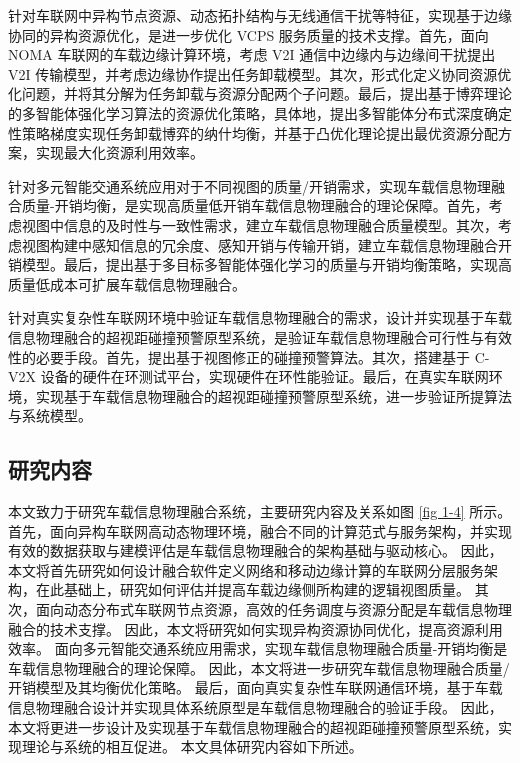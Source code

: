  针对车联网中异构节点资源、动态拓扑结构与无线通信干扰等特征，实现基于边缘协同的异构资源优化，是进一步优化 VCPS 服务质量的技术支撑。首先，面向 NOMA 车联网的车载边缘计算环境，考虑 V2I 通信中边缘内与边缘间干扰提出 V2I 传输模型，并考虑边缘协作提出任务卸载模型。其次，形式化定义协同资源优化问题，并将其分解为任务卸载与资源分配两个子问题。最后，提出基于博弈理论的多智能体强化学习算法的资源优化策略，具体地，提出多智能体分布式深度确定性策略梯度实现任务卸载博弈的纳什均衡，并基于凸优化理论提出最优资源分配方案，实现最大化资源利用效率。

 针对多元智能交通系统应用对于不同视图的质量/开销需求，实现车载信息物理融合质量-开销均衡，是实现高质量低开销车载信息物理融合的理论保障。首先，考虑视图中信息的及时性与一致性需求，建立车载信息物理融合质量模型。其次，考虑视图构建中感知信息的冗余度、感知开销与传输开销，建立车载信息物理融合开销模型。最后，提出基于多目标多智能体强化学习的质量与开销均衡策略，实现高质量低成本可扩展车载信息物理融合。


 针对真实复杂性车联网环境中验证车载信息物理融合的需求，设计并实现基于车载信息物理融合的超视距碰撞预警原型系统，是验证车载信息物理融合可行性与有效性的必要手段。首先，提出基于视图修正的碰撞预警算法。其次，搭建基于 C-V2X 设备的硬件在环测试平台，实现硬件在环性能验证。最后，在真实车联网环境，实现基于车载信息物理融合的超视距碰撞预警原型系统，进一步验证所提算法与系统模型。

\subsection{研究内容}

本文致力于研究车载信息物理融合系统，主要研究内容及关系如图 \ref{fig 1-4} 所示。
首先，面向异构车联网高动态物理环境，融合不同的计算范式与服务架构，并实现有效的数据获取与建模评估是车载信息物理融合的架构基础与驱动核心。
因此，本文将首先研究如何设计融合软件定义网络和移动边缘计算的车联网分层服务架构，在此基础上，研究如何评估并提高车载边缘侧所构建的逻辑视图质量。
其次，面向动态分布式车联网节点资源，高效的任务调度与资源分配是车载信息物理融合的技术支撑。
因此，本文将研究如何实现异构资源协同优化，提高资源利用效率。
面向多元智能交通系统应用需求，实现车载信息物理融合质量-开销均衡是车载信息物理融合的理论保障。
因此，本文将进一步研究车载信息物理融合质量/开销模型及其均衡优化策略。
最后，面向真实复杂性车联网通信环境，基于车载信息物理融合设计并实现具体系统原型是车载信息物理融合的验证手段。
因此，本文将更进一步设计及实现基于车载信息物理融合的超视距碰撞预警原型系统，实现理论与系统的相互促进。
本文具体研究内容如下所述。

